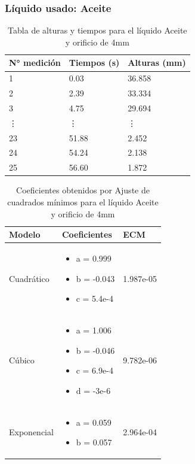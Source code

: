 \documentclass{article}
\begin{document}
\subsubsection{Líquido usado: Aceite}
\begin{table}[H]
    \begin{center}
        \begin{tabular}{ | m{2cm} | m{2cm} | m{2cm} | }
            \hline N° medición & Tiempos (s) & Alturas (mm) \\ 
            \hline 1 & 0.03 & 36.858 \\
            \hline 2 & 2.39 & 33.334 \\
            \hline 3 & 4.75 & 29.694 \\
            \hline \vdots & \vdots & \vdots \\            
            \hline 23 & 51.88 &  2.452\\
            \hline 24 & 54.24 & 2.138 \\
            \hline 25 & 56.60 & 1.872 \\
            \hline
        \end{tabular}
    \end{center}
    \caption{Tabla de alturas y tiempos para el líquido Aceite y orificio de 4mm}
\end{table}

\begin{table}[h]
    \begin{center}
        \begin{tabular}{ | m{2cm} | m{5cm} | m{2cm} | }
            \hline Modelo & Coeficientes & ECM \\ 
            \hline Cuadrático & \begin{itemize}
                \item a = 0.999
                \item b = -0.043
                \item c = 5.4e-4
            \end{itemize} & 1.987e-05 \\
            \hline Cúbico & \begin{itemize}
                \item a = 1.006
                \item b = -0.046
                \item c = 6.9e-4
                \item d = -3e-6
            \end{itemize} & 9.782e-06 \\
            \hline Exponencial & \begin{itemize}
                \item a = 0.059
                \item b = 0.057
            \end{itemize} & 2.964e-04 \\
            \hline
        \end{tabular}
    \end{center}
    \caption{Coeficientes obtenidos por Ajuste de cuadrados mínimos para el líquido Aceite y orificio de 4mm}
\end{table}
\end{document}
